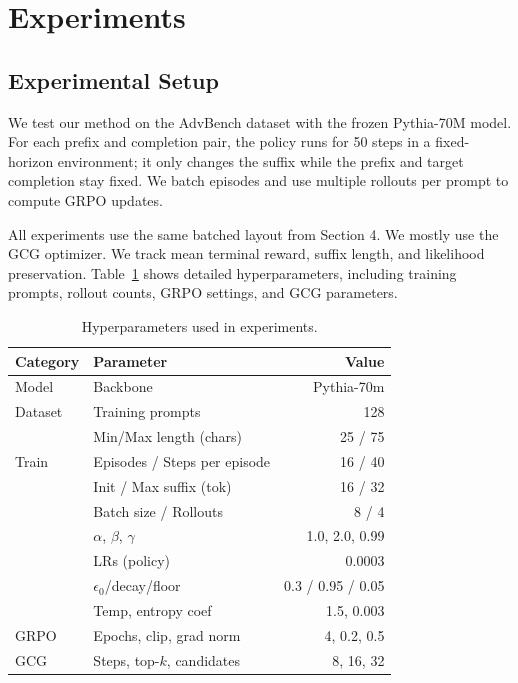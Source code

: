 \documentclass[11pt]{article}
\begin{document}
\section{Experiments}
\label{sec:experiments}


\subsection{Experimental Setup}
\label{subsec:setup}

We test our method on the AdvBench dataset \cite{zou2023universal} with the frozen Pythia-70M model. For each prefix and completion pair, the policy runs for 50 steps in a fixed-horizon environment; it only changes the suffix while the prefix and target completion stay fixed. We batch episodes and use multiple rollouts per prompt to compute GRPO updates.

All experiments use the same batched layout from Section 4. We mostly use the GCG optimizer. We track mean terminal reward, suffix length, and likelihood preservation. Table~\ref{tab:hyperparams} shows detailed hyperparameters, including training prompts, rollout counts, GRPO settings, and GCG parameters.

\begin{table}[h]
\centering
\small
\begin{tabular}{llr}
\toprule
Category & Parameter & Value \\
\midrule
Model     & Backbone              & Pythia-70m \\
Dataset   & Training prompts         & 128 \\
          & Min/Max length (chars)& 25 / 75 \\
Train     & Episodes / Steps per episode      & 16 / 40 \\
          & Init / Max suffix (tok)& 16 / 32 \\
          & Batch size / Rollouts & 8 / 4 \\
          & $\alpha$, $\beta$, $\gamma$ & 1.0, 2.0, 0.99 \\
          & LRs (policy)   &  0.0003 \\
          & $\epsilon_0$/decay/floor& 0.3 / 0.95 / 0.05 \\
          & Temp, entropy coef    & 1.5, 0.003 \\
GRPO      & Epochs, clip, grad norm& 4, 0.2, 0.5 \\
GCG       & Steps, top-$k$, candidates & 8, 16, 32 \\
\bottomrule
\end{tabular}
\caption{Hyperparameters used in experiments.}
\label{tab:hyperparams}
\end{table}
\end{document}
